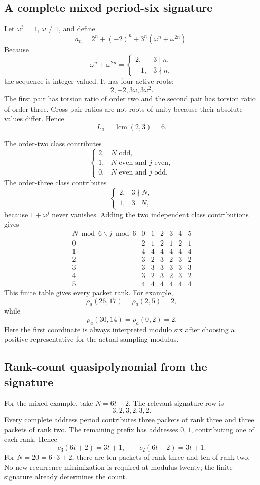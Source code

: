\documentclass[11pt]{article}
\theoremstyle{definition}\newtheorem{definition}[theorem]{Definition}\newtheorem{example}[theorem]{Example}\newtheorem{construction}[theorem]{Construction}\newtheorem{algorithm}[theorem]{Algorithm}\newtheorem{conjecture}[theorem]{Conjecture}\newtheorem{problem}[theorem]{Problem}
\theoremstyle{remark}\newtheorem{remark}[theorem]{Remark}\newtheorem{boundary}[theorem]{Boundary}\newtheorem{certificate}[theorem]{Computational Certificate}\newtheorem{classical}[theorem]{Classical Input}\newtheorem{principle}[theorem]{Structural Principle}
\begin{document}
\subsection{A complete mixed period-six signature}
Let $\omega^3=1$, $\omega\neq1$, and define
\[
 a_n=2^n+(-2)^n+3^n(\omega^n+\omega^{2n}).
\]
Because
\[
 \omega^n+\omega^{2n}
 =\begin{cases}2,&3\mid n,\\-1,&3\nmid n,\end{cases}
\]
the sequence is integer-valued.  It has four active roots:
\[
 2,-2,3\omega,3\omega^2.
\]
The first pair has torsion ratio of order two and the second pair has torsion ratio of order three.  Cross-pair ratios are not roots of unity because their absolute values differ.  Hence
\[
 L_a=\operatorname{lcm}(2,3)=6.
\]

The order-two class contributes
\[
 \begin{cases}
 2,&N\text{ odd},\\
 1,&N\text{ even and }j\text{ even},\\
 0,&N\text{ even and }j\text{ odd}.
 \end{cases}
\]
The order-three class contributes
\[
 \begin{cases}
 2,&3\nmid N,\\
 1,&3\mid N,
 \end{cases}
\]
because $1+\omega^j$ never vanishes.  Adding the two independent class contributions gives
\[
\begin{array}{c|rrrrrr}
N\bmod6\backslash j\bmod6&0&1&2&3&4&5\\
\hline
0&2&1&2&1&2&1\\
1&4&4&4&4&4&4\\
2&3&2&3&2&3&2\\
3&3&3&3&3&3&3\\
4&3&2&3&2&3&2\\
5&4&4&4&4&4&4
\end{array}
\]
This finite table gives every packet rank.  For example,
\[
 \rho_a(26,17)=\rho_a(2,5)=2,
\]
while
\[
 \rho_a(30,14)=\rho_a(0,2)=2.
\]
Here the first coordinate is always interpreted modulo six after choosing a positive representative for the actual sampling modulus.

\subsection{Rank-count quasipolynomial from the signature}
For the mixed example, take $N=6t+2$.  The relevant signature row is
\[
 3,2,3,2,3,2.
\]
Every complete address period contributes three packets of rank three and three packets of rank two.  The remaining prefix has addresses $0,1$, contributing one of each rank.  Hence
\[
 \boxed{
 c_3(6t+2)=3t+1,
 \qquad
 c_2(6t+2)=3t+1.
 }
\]
For $N=20=6\cdot3+2$, there are ten packets of rank three and ten of rank two.  No new recurrence minimization is required at modulus twenty; the finite signature already determines the count.
\end{document}
